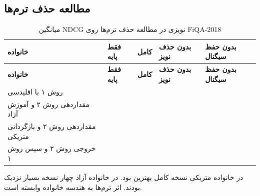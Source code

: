 \documentclass[a4paper,12pt]{article}
\begin{document}
\subsection{مطالعه حذف ترم‌ها}
\scriptsize
\begin{longtable}{|C{5.5cm}|C{2.4cm}|C{2.4cm}|C{2.4cm}|C{2.6cm}|}
\caption{میانگین NDCG نویزی در مطالعه حذف ترم‌ها روی FiQA-2018}\label{tab:fiqa-ablation}\\
\hline
\textbf{خانواده} & \textbf{فقط پایه} & \textbf{کامل} & \textbf{بدون حذف نویز} & \textbf{بدون حفظ سیگنال} \\
\hline
\endfirsthead
\hline
\textbf{خانواده} & \textbf{فقط پایه} & \textbf{کامل} & \textbf{بدون حذف نویز} & \textbf{بدون حفظ سیگنال} \\
\hline
\endhead
روش ۱ با  اقلیدسی &  &  & \textbf{} &  \\
\hline
مقداردهی روش ۲ و آموزش آزاد &  & \textbf{} &  &  \\
\hline
مقداردهی روش ۲ و بازگردانی متریکی &  & \textbf{} &  &  \\
\hline
{} خروجی روش ۲ و سپس روش ۱ &  &  & \textbf{} &  \\
\hline
\end{longtable}
در خانواده متریکی نسخه کامل بهترین بود. در خانواده آزاد چهار نسخه بسیار نزدیک بودند. اثر ترم‌ها به هندسه خانواده وابسته است.
\end{document}
